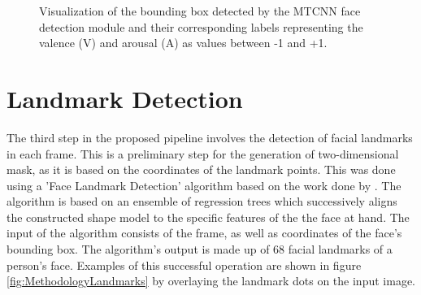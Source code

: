 \begin{figure}[ht]
  \hfill
  \caption{Visualization of the bounding box detected by the MTCNN face detection module \citep{Zhang:2016:MTCCN} and their corresponding labels representing the valence (V) and arousal (A) as values between -1 and +1.}
  \label{fig:MethodologyBoundingBox}
\end{figure}



\section{Landmark Detection}
The third step in the proposed pipeline involves the detection of facial landmarks in each frame. This is a preliminary step for the generation of two-dimensional mask, as it is based on the coordinates of the landmark points.
\newline\newline
This was done using a 'Face Landmark Detection' algorithm based on the work done by \citet{Kazemi:2014:ShapePredictor}. The algorithm is based on an ensemble of regression trees which successively aligns the constructed shape model to the specific features of the the face at hand.
\newline\newline
The input of the algorithm consists of the frame, as well as coordinates of the face's bounding box. The algorithm's output is made up of 68 facial landmarks of a person's face. Examples of this successful operation are shown in figure \ref{fig:MethodologyLandmarks} by overlaying the landmark dots on the input image.
\citep{Datahacker:2020:DlibFacialLandmarks}

